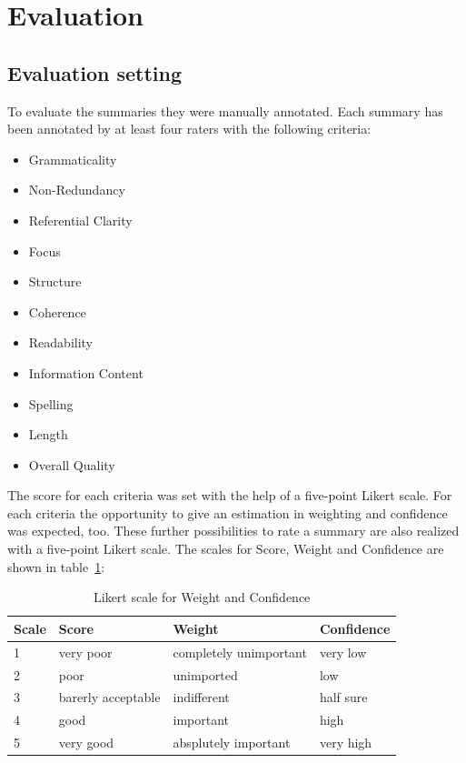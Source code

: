 
\section{Evaluation}
\label{ch:evaluation}

\subsection{Evaluation setting}
To evaluate the summaries they were manually annotated.
Each summary has been annotated by at least four raters with the following criteria:
\begin{itemize}[itemsep = 0pt, topsep =0pt]
		\item Grammaticality      
		\item Non-Redundancy      
		\item Referential Clarity 
		\item Focus               
		\item Structure           
		\item Coherence           
		\item Readability         
		\item Information Content 
		\item Spelling            
		\item Length              
		\item Overall Quality     
\end{itemize}

The score for each criteria was set with the help of a five-point Likert scale.
For each criteria the opportunity to give an estimation in weighting and confidence was expected, too. These further possibilities to rate a summary are also realized with a five-point Likert scale.
The scales for Score, Weight and Confidence are shown in table~\ref{tab:evalikert}:

\begin{table}[H]
	\begin{tabularx}{\textwidth}{l|XXX} \toprule
		Scale & Score & Weight & Confidence \\ \midrule
		1 & very poor & completely unimportant & very low \\
		2 & poor & unimported & low \\
		3 & barerly acceptable & indifferent & half sure \\
		4 & good & important & high \\
		5 & very good & absplutely important & very high \\ \bottomrule    
	\end{tabularx}
	\caption{Likert scale for Weight and Confidence}
	\label{tab:evalikert}
\end{table}

